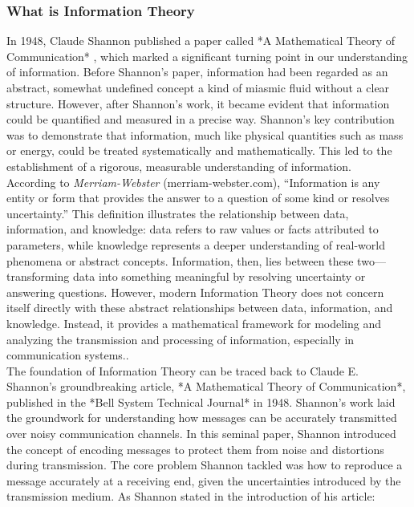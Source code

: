 \documentclass[12pt, oneside]{book}
\begin{document}
\subsubsection{What is  Information Theory}
In 1948, Claude Shannon published a paper called *A Mathematical Theory of Communication* , which marked a significant turning point in our understanding of information. Before Shannon’s paper, information had been regarded as an abstract, somewhat undefined concept a kind of miasmic fluid without a clear structure. However, after Shannon's work, it became evident that information could be quantified and measured in a precise way. Shannon’s key contribution was to demonstrate that information, much like physical quantities such as mass or energy, could be treated systematically and mathematically. This led to the establishment of a rigorous, measurable understanding of information.\vspace{0.5cm}\\
According to \textit{Merriam-Webster} (merriam-webster.com), “Information is any entity or form that provides the answer to a question of some kind or resolves uncertainty.” This definition illustrates the relationship between data, information, and knowledge: data refers to raw values or facts attributed to parameters, while knowledge represents a deeper understanding of real-world phenomena or abstract concepts. Information, then, lies between these two—transforming data into something meaningful by resolving uncertainty or answering questions. However, modern Information Theory does not concern itself directly with these abstract relationships between data, information, and knowledge. Instead, it provides a mathematical framework for modeling and analyzing the transmission and processing of information, especially in communication systems..\vspace{0.5cm}\\
The foundation of Information Theory can be traced back to Claude E. Shannon's groundbreaking article, *A Mathematical Theory of Communication*, published in the *Bell System Technical Journal* in 1948. Shannon's work laid the groundwork for understanding how messages can be accurately transmitted over noisy communication channels. In this seminal paper, Shannon introduced the concept of encoding messages to protect them from noise and distortions during transmission. The core problem Shannon tackled was how to reproduce a message accurately at a receiving end, given the uncertainties introduced by the transmission medium. As Shannon stated in the introduction of his article:\\
\end{document}
